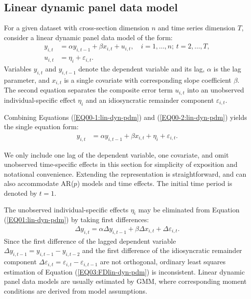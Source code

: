 \subsection{Linear dynamic panel data model}
For a given dataset with cross-section dimension $n$ and time series dimension $T$, consider a linear dynamic panel data model of the form:
\begin{align}
y_{i, t} & = \alpha y_{i, t - 1} + \beta x_{i, t} + u_{i,t}, \quad i = 1, \dots, n;\ t = 2, \dots, T,\label{EQ00-1:lin-dyn-pdm} \\
u_{i,t} & = \eta_{i} + \varepsilon_{i, t}. \label{EQ00-2:lin-dyn-pdm}
\end{align}
Variables $y_{i,t}$ and $y_{i,t-1}$ denote the dependent variable and its lag, $\alpha$ is the lag parameter, and $x_{i,t}$ is a single covariate with corresponding slope coefficient $\beta$. The second equation separates the composite error term $u_{i,t}$ into an unobserved individual-specific effect $\eta_i$ and an idiosyncratic remainder component $\varepsilon_{i,t}$.

Combining Equations (\ref{EQ00-1:lin-dyn-pdm}) and (\ref{EQ00-2:lin-dyn-pdm}) yields the single equation form:
\begin{align} \label{EQ01:lin-dyn-pdm}
y_{i, t} & = \alpha y_{i, t - 1} + \beta x_{i, t} + \eta_{i} + \varepsilon_{i, t}.
\end{align}

We only include one lag of the dependent variable, one covariate, and omit unobserved time-specific effects in this section for simplicity of exposition and notational convenience. Extending the representation is straightforward, and  can also accommodate AR($p$) models and time effects. The initial time period is denoted by $t=1$.

The unobserved individual-specific effects $\eta_i$ may be eliminated from Equation (\ref{EQ01:lin-dyn-pdm}) by taking first differences:
\begin{align} \label{EQ03:FDlin-dyn-pdm}
\Delta y_{i, t} = \alpha \Delta y_{i, t - 1} + \beta \Delta x_{i, t} + \Delta \varepsilon_{i, t}.
\end{align}
Since the first difference of the lagged dependent variable $\Delta y_{i,t-1} = y_{i,t-1} - y_{i,t-2}$ and the first difference of the idiosyncratic remainder component $\Delta \varepsilon_{i,t} = \varepsilon_{i,t} - \varepsilon_{i,t-1}$ are not orthogonal, ordinary least squares estimation of Equation (\ref{EQ03:FDlin-dyn-pdm}) is inconsistent. Linear dynamic panel data models are usually estimated by GMM, where corresponding moment conditions are derived from model assumptions.




